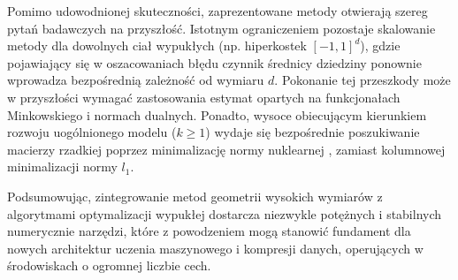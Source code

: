 Pomimo udowodnionej skuteczności, zaprezentowane metody otwierają szereg pytań badawczych na przyszłość. Istotnym ograniczeniem pozostaje skalowanie metody dla dowolnych ciał wypukłych (np. hiperkostek $[-1, 1]^d$), gdzie pojawiający się w oszacowaniach błędu czynnik średnicy dziedziny ponownie wprowadza bezpośrednią zależność od wymiaru $d$. Pokonanie tej przeszkody może w przyszłości wymagać zastosowania estymat opartych na funkcjonałach Minkowskiego i normach dualnych. Ponadto, wysoce obiecującym kierunkiem rozwoju uogólnionego modelu ($k \ge 1$) wydaje się bezpośrednie poszukiwanie macierzy rzadkiej poprzez minimalizację normy nuklearnej \cite{fornasier2010numerical}, zamiast kolumnowej minimalizacji normy $l_1$.

Podsumowując, zintegrowanie metod geometrii wysokich wymiarów z algorytmami optymalizacji wypukłej dostarcza niezwykle potężnych i stabilnych numerycznie narzędzi, które z powodzeniem mogą stanowić fundament dla nowych architektur uczenia maszynowego i kompresji danych, operujących w środowiskach o ogromnej liczbie cech.